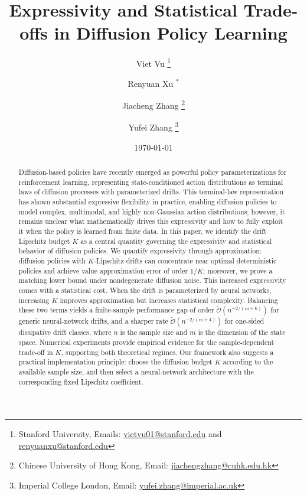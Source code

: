 \documentclass{article}
\title{Expressivity and Statistical Trade-offs in Diffusion Policy Learning
}
\author{%
  Viet Vu \thanks{Stanford University, 
  Emails: \url{vietvu01@stanford.edu} and \url{renyuanxu@stanford.edu}}
  \and
  Renyuan Xu $^*$
  \and
   Jiacheng Zhang \thanks{Chinese University of Hong Kong, Email: \url{jiachengzhang@cuhk.edu.hk}} 
  \and
   Yufei Zhang \thanks{Imperial College London, Email: \url{yufei.zhang@imperial.ac.uk}} 
}
\date{\today}
\newcommand{\1}{\mathbbm{1}}
\numberwithin{equation}{section}
\begin{document}
\maketitle

\begin{abstract}
Diffusion-based policies have recently emerged as powerful policy parameterizations for reinforcement learning, representing state-conditioned action distributions as terminal laws of diffusion processes with parameterized drifts. This terminal-law representation has shown substantial expressive flexibility in practice, enabling diffusion policies to model complex, multimodal, and highly non-Gaussian action distributions; however, it remains unclear what mathematically drives this expressivity and how to fully exploit it when the policy is learned from finite data. 
In this paper, we identify the drift Lipschitz budget \(K\) as a central quantity governing the expressivity and statistical behavior of diffusion policies. We quantify expressivity through approximation: diffusion policies with \(K\)-Lipschitz drifts can concentrate near optimal deterministic policies and achieve value approximation error of order \(1/K\); moreover, we prove a matching lower bound under nondegenerate diffusion noise. This increased expressivity comes with a statistical cost. When the drift is parameterized by neural networks, increasing \(K\) improves approximation but increases statistical complexity. Balancing these two terms yields a finite-sample performance gap of order \(\tilde{\mathcal O}(n^{-2/(m+6)})\) for generic neural-network drifts, and a sharper rate \(\tilde{\mathcal O}(n^{-2/(m+4)})\) for one-sided dissipative drift classes, where $n$ is the sample size and $m$ is the dimension of the state space. Numerical experiments provide empirical evidence for the sample-dependent trade-off in $K$, supporting both theoretical regimes. Our framework also suggests a practical implementation principle: choose the diffusion budget \(K\) according to the available sample size, and then select a neural-network architecture with the corresponding fixed Lipschitz coefficient.



\end{abstract}
\end{document}
